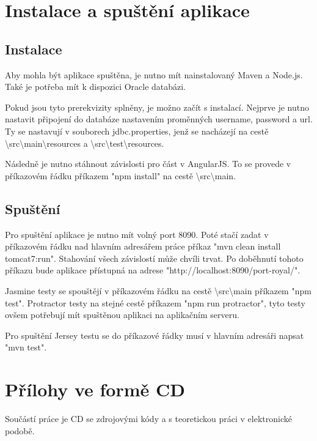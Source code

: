 \documentclass[czech,master,public,dept460,male,cpdeclaration,twoside]{diploma}
\begin{document}
\appendix
\section{Instalace a spuštění aplikace}

\subsection{Instalace}
Aby mohla být aplikace spuštěna, je nutno mít nainstalovaný Maven a Node.js. Také je potřeba mít k dispozici Oracle databázi.

Pokud jsou tyto prerekvizity splněny, je možno začít s instalací. Nejprve je nutno nastavit připojení do databáze nastavením proměnných username, password a url. Ty se nastavují v souborech jdbc.properties, jenž se nacházejí na cestě \textbackslash src\textbackslash main\textbackslash resources a \textbackslash src\textbackslash test\textbackslash resources.

Následně je nutno stáhnout závislosti pro část v AngularJS. To se provede v příkazovém řádku příkazem "npm install" na cestě \textbackslash src\textbackslash main.

\subsection{Spuštění}
Pro spuštění aplikace je nutno mít volný port 8090. Poté stačí zadat v příkazovém řádku nad hlavním adresářem práce příkaz "mvn clean install tomcat7:run". Stahování všech závislostí může chvíli trvat. Po doběhnutí tohoto příkazu bude aplikace přístupná na adrese "http://localhost:8090/port-royal/".

Jasmine testy se spouštějí v příkazovém řádku na cestě \textbackslash src\textbackslash main příkazem "npm test". Protractor testy na stejné cestě příkazem "npm run protractor", tyto testy ovšem potřebují mít spuštěnou aplikaci na aplikačním serveru.

Pro spuštění Jersey testu se do příkazové řádky musí v hlavním adresáři napsat "mvn test".

\section{Přílohy ve formě CD}
Součástí práce je CD se zdrojovými kódy a s teoretickou práci v elektronické podobě.
\end{document}
